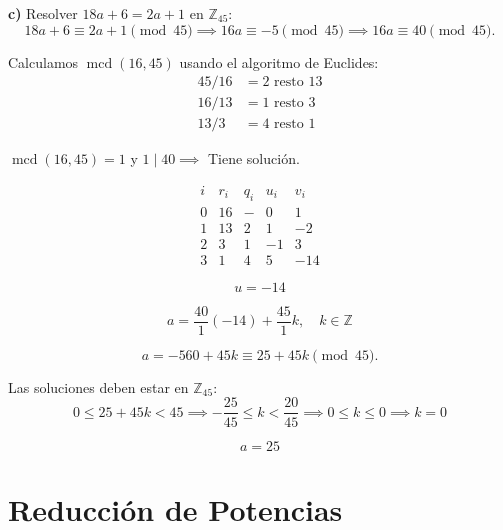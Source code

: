 \documentclass[a4paper,12pt]{article}
\begin{document}
\begin{ejercicio}[title=Ejercicio 42]

\textbf{c) } Resolver $18a + 6 = 2a + 1$ en $\mathbb{Z}_{45}$:
\[
18a + 6 \equiv 2a + 1 \pmod{45} \implies 16a \equiv -5 \pmod{45} \implies 16a \equiv 40 \pmod{45}.
\]

Calculamos \(\operatorname{mcd}(16,45)\) usando el algoritmo de Euclides:
\begin{align*}
45 / 16 &= 2 \text{ resto } 13 \\
16 / 13 &= 1 \text{ resto } 3 \\
13 / 3  &= 4 \text{ resto } \boxed{1}
\end{align*}

\(\operatorname{mcd}(16,45) = 1\) y $1 \mid 40 \implies$ Tiene solución.

\[
\begin{array}{c|c|c|c|c}
i & r_i & q_i & u_i & v_i \\
\hline
0 & 16 & - & 0 & 1 \\
1 & 13 & 2 & 1 & -2 \\
2 & 3 & 1 & -1 & 3 \\
3 & \boxed{1} & 4 & 5 & -14
\end{array}
\]

\[
u = -14
\]

\[
a = \frac{40}{1}(-14) + \frac{45}{1} k, \quad k \in \mathbb{Z}
\]

\[
a = -560 + 45 k \equiv 25 + 45 k \pmod{45}.
\]

Las soluciones deben estar en $\mathbb{Z}_{45}$:
\[
0 \le 25 + 45 k < 45 \implies -\frac{25}{45} \le k < \frac{20}{45} \implies 0 \le k \le 0 \implies k = 0
\]

\[
\boxed{a = 25}
\]

\end{ejercicio}

\section{Reducción de Potencias}
\end{document}

